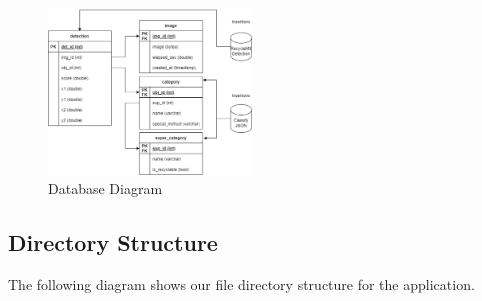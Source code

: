 \documentclass[conference]{IEEEtran}
\begin{document}
\begin{figure}[h]
    \centering
    \includegraphics[width=0.48\textwidth]{images/db_diagram.eps}
    \caption{Database Diagram}
\end{figure}

\subsection{Directory Structure}
The following diagram shows our file directory structure for the application.
\end{document}
